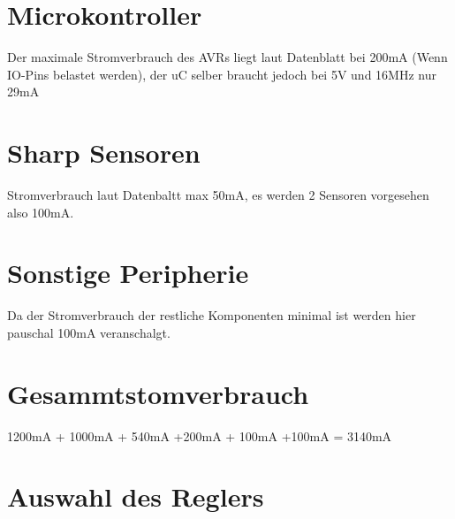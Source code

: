 \section{Microkontroller}
Der maximale Stromverbrauch des AVRs liegt laut Datenblatt\cite{ds-at90can} bei 200mA (Wenn IO-Pins belastet werden),
der uC selber braucht jedoch  bei 5V und 16MHz nur 29mA

\section{Sharp Sensoren}
Stromverbrauch laut Datenbaltt max 50mA, es werden 2 Sensoren vorgesehen also 100mA.\cite{ds-sharp-GP2D120}

\section{Sonstige Peripherie}
Da der Stromverbrauch der restliche Komponenten minimal ist werden hier pauschal 100mA veranschalgt.

\section{Gesammtstomverbrauch}
1200mA + 1000mA + 540mA +200mA + 100mA +100mA = 3140mA

\section{Auswahl des Reglers}